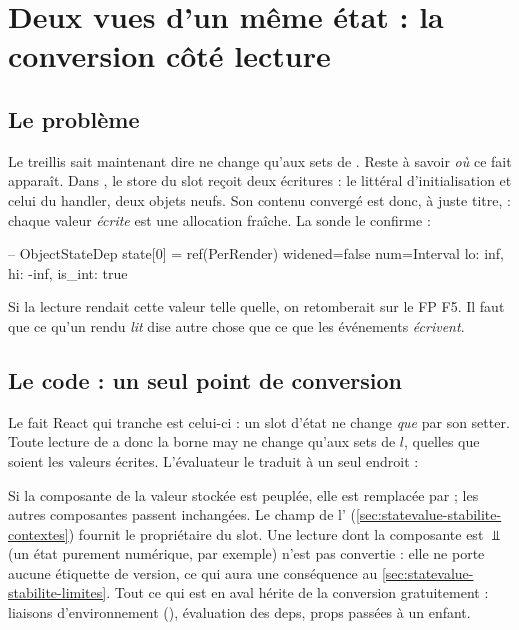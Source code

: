 \section{Deux vues d'un même état : la conversion côté lecture}
\label{sec:statevalue-stabilite-lecture}

\subsection{Le problème}

Le treillis sait maintenant dire \og ne change qu'aux sets de
\fg{}. Reste à savoir \emph{où} ce fait apparaît. Dans
, le store du slot reçoit deux écritures : le
littéral d'initialisation et celui du handler, deux objets neufs. Son contenu
convergé est donc, à juste titre,  : chaque valeur
\emph{écrite} est une allocation fraîche. La sonde le confirme :
\begin{sortie}
-- ObjectStateDep
   state[0] = ref(PerRender)   widened=false  num=Interval { lo: inf, hi: -inf, is_int: true }
\end{sortie}
Si la lecture  rendait cette valeur telle quelle, on retomberait
sur le FP F5. Il faut que ce qu'un rendu \emph{lit} dise autre chose que ce
que les événements \emph{écrivent}.

\subsection{Le code : un seul point de conversion}

Le fait React qui tranche est celui-ci : un slot d'état ne change \emph{que}
par son setter. Toute lecture de  a donc la borne may
\og ne change qu'aux sets de $l$\fg{}, quelles que soient les valeurs écrites.
L'évaluateur le traduit à un seul endroit :


Si la composante  de la valeur stockée est peuplée, elle est
remplacée par  ; les autres composantes
passent inchangées. Le champ  de l'
(\cref{sec:statevalue-stabilite-contextes}) fournit le propriétaire du slot.
Une lecture dont la composante  est $\Bot$ (un état
purement numérique, par exemple) n'est pas convertie : elle ne porte aucune
étiquette de version, ce qui aura une conséquence au
\cref{sec:statevalue-stabilite-limites}. Tout ce qui est en aval hérite de
la conversion gratuitement : liaisons d'environnement
(), évaluation des deps, props passées à un enfant.

